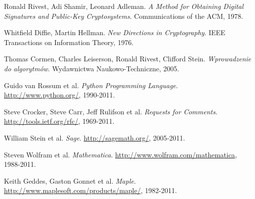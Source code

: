 \begin{thebibliography}{99}
    Ronald Rivest, Adi Shamir, Leonard Adleman.
    \emph{A Method for Obtaining Digital Signatures
        and Public-Key Cryptosystems}.
    Communications of the ACM, 1978.

    Whitfield Diffie, Martin Hellman.
    \emph{New Directions in Cryptography}.
    IEEE Transactions on Information Theory, 1976.

    Thomas Cormen, Charles Leiserson, Ronald Rivest, Clifford Stein.
    \emph{Wprowadzenie do algorytmów}.
    Wydawnictwa Naukowo-Techniczne, 2005.

    Guido van Rossum et al.
    \emph{Python Programming Language}.
    \url{http://www.python.org/}, 1990-2011.

    Steve Crocker, Steve Carr, Jeff Rulifson et al.
    \emph{Requests for Comments}.
    \url{http://tools.ietf.org/rfc/}, 1969-2011.

    William Stein et al.
    \emph{Sage}.
    \url{http://sagemath.org/}, 2005-2011.

    Steven Wolfram et al.
    \emph{Mathematica}.
    \url{http://www.wolfram.com/mathematica}, 1988-2011.

    Keith Geddes, Gaston Gonnet et al.
    \emph{Maple}.
    \url{http://www.maplesoft.com/products/maple/}, 1982-2011.

\end{thebibliography}
